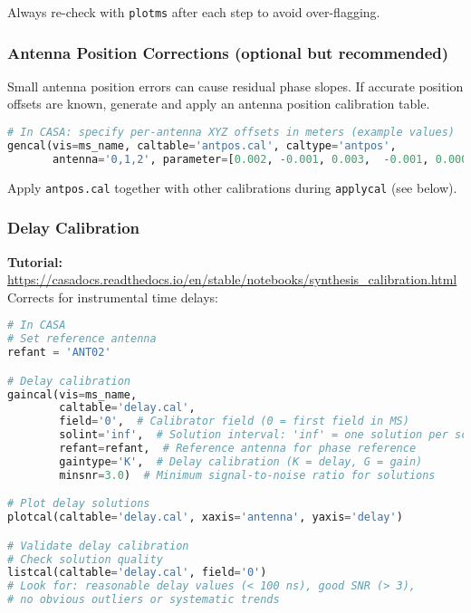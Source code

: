 \documentclass[11pt]{article}
\begin{document}
Always re-check with \texttt{plotms} after each step to avoid over-flagging.

\subsubsection{Antenna Position Corrections (optional but recommended)}
Small antenna position errors can cause residual phase slopes. If accurate position offsets are known, generate and apply an antenna position calibration table.
\begin{lstlisting}[language=Python]
# In CASA: specify per-antenna XYZ offsets in meters (example values)
gencal(vis=ms_name, caltable='antpos.cal', caltype='antpos',
       antenna='0,1,2', parameter=[0.002, -0.001, 0.003,  -0.001, 0.000, 0.002,  0.000, 0.001, -0.002])
\end{lstlisting}
Apply \texttt{antpos.cal} together with other calibrations during \texttt{applycal} (see below).

\subsubsection{Delay Calibration}
\textbf{Tutorial:} \url{https://casadocs.readthedocs.io/en/stable/notebooks/synthesis_calibration.html}
Corrects for instrumental time delays:

\begin{lstlisting}[language=Python]
# In CASA
# Set reference antenna
refant = 'ANT02'

# Delay calibration
gaincal(vis=ms_name, 
        caltable='delay.cal', 
        field='0',  # Calibrator field (0 = first field in MS)
        solint='inf',  # Solution interval: 'inf' = one solution per scan
        refant=refant,  # Reference antenna for phase reference
        gaintype='K',  # Delay calibration (K = delay, G = gain)
        minsnr=3.0)  # Minimum signal-to-noise ratio for solutions

# Plot delay solutions
plotcal(caltable='delay.cal', xaxis='antenna', yaxis='delay')

# Validate delay calibration
# Check solution quality
listcal(caltable='delay.cal', field='0')
# Look for: reasonable delay values (< 100 ns), good SNR (> 3), 
# no obvious outliers or systematic trends
\end{lstlisting}
\end{document}
